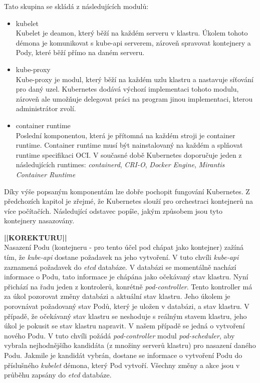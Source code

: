Tato skupina se skládá z následujících modulů:
\begin{itemize}
    \item kubelet\\
    Kubelet je deamon, který běží na každém serveru v klastru. Úkolem tohoto démona je komunikovat s kube-api serverem, zároveň spravovat kontejnery a Pody, které běží přímo na daném serveru. 
    \item kube-proxy\\
    Kube-proxy je modul, který běží na každém uzlu klastru a nastavuje síťování pro daný uzel. Kubernetes dodává výchozí implementaci tohoto modulu, zároveň ale umožňuje delegovat práci na program jinou implementaci, kterou administrátor zvolí. 
    \item container runtime\\
    Poslední komponentou, která je přítomná na každém stroji je container runtime. Container runtime musí být nainstalovaný na každém a splňovat runtime specifikaci OCI. V současné době Kubernetes doporučuje jeden z následujících runtimes: \textit{containerd}, \textit{CRI-O}, \textit{Docker Engine}, \textit{Mirantis Container Runtime} \cite{thekubernetesauthors_2023_container} 
\end{itemize}

Díky výše popsaným komponentám lze dobře pochopit fungování Kubernetes. Z předchozích kapitol je zřejmé, že Kubernetes slouží pro orchestraci kontejnerů na více počítačích. Následující odstavec popíše, jakým způsobem jsou tyto kontejnery nasazovány.

\textbf{||KOREKTURU||}\\
Nasazení Podu (kontejneru - pro tento účel pod chápat jako kontejner) zažíná tím, že \textit{kube-api} dostane požadavek na jeho vytvoření. V tuto chvíli \textit{kube-api} zaznamená požadavek do \textit{etcd} databáze. V databázi se momentálně nachází informace o Podu, tato informace je chápána jako očekávaný stav klastru. Nyní přichází na řadu jeden z kontrolerů, konrétně \textit{pod-controller}. Tento kontroller má za úkol pozorovat změny databázi a aktuální stav klastru. Jeho úkolem je porovnávat požadovaný stav Podů, který je uložen v databázi, a stav klastru. V případě, že očekávaný stav klastru se neshoduje s reálným stavem klastru, jeho úkol je pokusit se stav klastru napravit. V našem případě se jedná o vytvoření nového Podu. V tuto chvíli požádá \textit{pod-controller} modul \textit{pod-scheduler}, aby vybrala nejhodnějšího kandidáta (z množiny serverů klastru) pro nasazení daného Podu. Jakmile je kandidát vybrán, dostane se informace o vytvoření Podu do příslušného \textit{kubelet} démona, který Pod vytvoří. Všechny změny a akce jsou v průběhu zapsány do \textit{etcd} databáze.  

